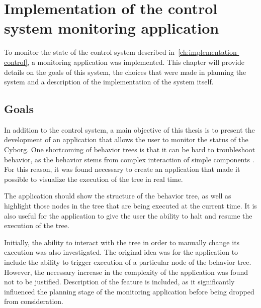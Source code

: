 \documentclass[\rootfolder/main.tex]{subfiles}
\begin{document}
\chapter{Implementation of the control system monitoring application} %
\label{ch:implementation-monitoring} %

To monitor the state of the control system described in~\cref{ch:implementation-control}, a monitoring application was implemented.
This chapter will provide details on the goals of this system, the choices that were made in planning the system and a description of the implementation of the system itself.


\section{Goals}

In addition to the control system, a main objective of this thesis is to present the development of an application that allows the user to monitor the status of the Cyborg.
One shortcoming of behavior trees is that it can be hard to troubleshoot behavior, as the behavior stems from complex interaction of simple components \cite{Millington2009}.
For this reason, it was found necessary to create an application that made it possible to visualize the execution of the tree in real time.

The application should show the structure of the behavior tree, as well as highlight those nodes in the tree that are being executed at the current time.
It is also useful for the application to give the user the ability to halt and resume the execution of the tree.

Initially, the ability to interact with the tree in order to manually change its execution was also investigated.
The original idea was for the application to include the ability to trigger execution of a particular node of the behavior tree.
However, the necessary increase in the complexity of the application was found not to be justified.
Description of the feature is included, as it significantly influenced the planning stage of the monitoring application before being dropped from consideration.
\end{document}
